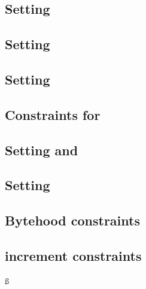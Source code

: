 \subsection{Setting \indexMax{}                            \lispTodo{}}    \label{bls: generalities: setting index max}                  
\subsection{Setting \blsIndex{}                            \lispTodo{}}    \label{bls: generalities: setting index}                      
\subsection{Setting           \maxCt{}                     \lispTodo{}}    \label{bls: generalities: setting ct_max}                     
\subsection{Constraints for \ct{}                          \lispTodo{}}    \label{bls: generalities: setting ct}                         
\subsection{Setting \isFirstInput{} and \isSecondInput{}   \lispTodo{}}    \label{bls: generalities: setting is_first and is_second}     
\subsection{Setting \accInputs{}                           \lispTodo{}}    \label{bls: generalities: setting acc pairings}               
\subsection{Bytehood constraints                           \lispTodo{}}    \label{bls: generalities: bytehood and accumulator}           
\subsection{\blsId{} increment constraints                 \lispTodo{}}    \label{bls: generalities: stamp increments}                   ß
